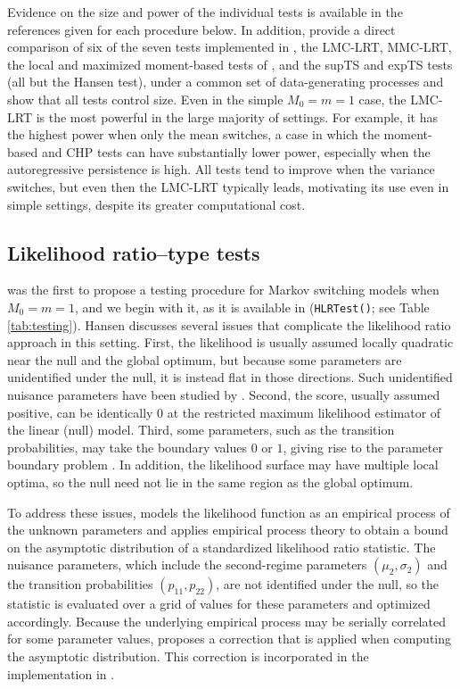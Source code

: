 Evidence on the size and power of the individual tests is available in the references given for each procedure below. In addition, \citet{rodrondufour_mcmstest} provide a direct comparison of six of the seven tests implemented in , the LMC-LRT, MMC-LRT, the local and maximized moment-based tests of \citet{dufourluger17}, and the supTS and expTS tests (all but the Hansen test), under a common set of data-generating processes and show that all tests control size. Even in the simple \(M_0 = m = 1\) case, the LMC-LRT is the most powerful in the large majority of settings. For example, it has the highest power when only the mean switches, a case in which the moment-based and CHP tests can have substantially lower power, especially when the autoregressive persistence is high. All tests tend to improve when the variance switches, but even then the LMC-LRT typically leads, motivating its use even in simple settings, despite its greater computational cost.

\subsection{Likelihood ratio--type tests}\label{likelihood-ratiotype-tests}

\citet{hansen92} was the first to propose a testing procedure for Markov switching models when \(M_0 = m = 1\), and we begin with it, as it is available in  (\texttt{HLRTest()}; see Table \ref{tab:testing}). Hansen discusses several issues that complicate the likelihood ratio approach in this setting. First, the likelihood is usually assumed locally quadratic near the null and the global optimum, but because some parameters are unidentified under the null, it is instead flat in those directions. Such unidentified nuisance parameters have been studied by \citep{davies1977, davies87, andrewsploberger94, dufour2006}. Second, the score, usually assumed positive, can be identically \(0\) at the restricted maximum likelihood estimator of the linear (null) model. Third, some parameters, such as the transition probabilities, may take the boundary values \(0\) or \(1\), giving rise to the parameter boundary problem \citep{andrews1999, andrews2001}. In addition, the likelihood surface may have multiple local optima, so the null need not lie in the same region as the global optimum.

To address these issues, \citet{hansen92} models the likelihood function as an empirical process of the unknown parameters and applies empirical process theory to obtain a bound on the asymptotic distribution of a standardized likelihood ratio statistic. The nuisance parameters, which include the second-regime parameters \((\mu_2, \sigma_2)\) and the transition probabilities \((p_{11}, p_{22})\), are not identified under the null, so the statistic is evaluated over a grid of values for these parameters and optimized accordingly. Because the underlying empirical process may be serially correlated for some parameter values, \citet{hansen96} proposes a correction that is applied when computing the asymptotic distribution. This correction is incorporated in the implementation in .

